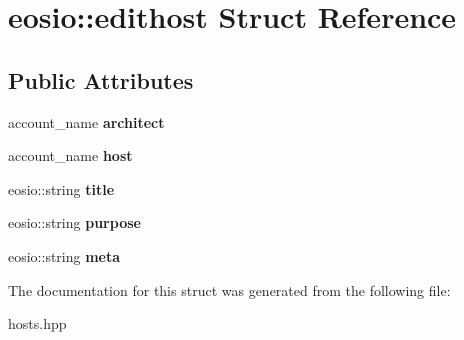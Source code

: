 \hypertarget{structeosio_1_1edithost}{}\section{eosio\+:\+:edithost Struct Reference}
\label{structeosio_1_1edithost}
\subsection*{Public Attributes}
\begin{DoxyCompactItemize}
\item 
\mbox{\label{structeosio_1_1edithost_a62597d96adcb24bd148175cbbf33f1d0}} 
account\+\_\+name {\bfseries architect}
\item 
\mbox{\label{structeosio_1_1edithost_a837e3df3d54879f6575b56135b250d74}} 
account\+\_\+name {\bfseries host}
\item 
\mbox{\label{structeosio_1_1edithost_acced28c5ce08ee2c1d431c9b14b1e9db}} 
eosio\+::string {\bfseries title}
\item 
\mbox{\label{structeosio_1_1edithost_a37f15cc2325a5ab5559324db5fd15800}} 
eosio\+::string {\bfseries purpose}
\item 
\mbox{\label{structeosio_1_1edithost_a49ba55496531603dfbc0db952b618bb3}} 
eosio\+::string {\bfseries meta}
\end{DoxyCompactItemize}


The documentation for this struct was generated from the following file\+:\begin{DoxyCompactItemize}
\item 
hosts.\+hpp\end{DoxyCompactItemize}
